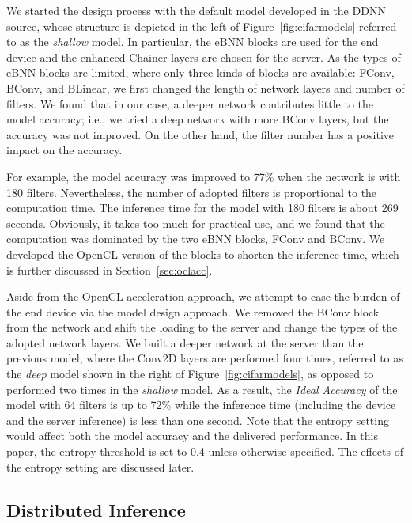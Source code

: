 \documentclass[format=acmsmall, review=false, screen=true]{acmart}
\def\figurename{Figure}
\def\sectionname{Section}
\begin{document}
We started the design process with the default model developed in the DDNN source, whose structure is depicted in the left of \figurename~\ref{fig:cifarmodels} referred to as the \emph{shallow} model. In particular, the eBNN blocks are used for the end device and the enhanced Chainer layers are chosen for the server. As the types of eBNN blocks are limited, where only three kinds of blocks are available: FConv, BConv, and BLinear, we first changed the length of network layers and number of filters. We found that in our case, a deeper network contributes little to the model accuracy; i.e., we tried a deep network with more BConv layers, but the accuracy was not improved. On the other hand, the filter number has a positive impact on the accuracy.

For example, the model accuracy was improved to 77\% when the network is with 180 filters.
Nevertheless, the number of adopted filters is proportional to the computation time. The inference time for the model with 180 filters is about 269 seconds. Obviously, it takes too much for practical use, and we found that the computation was dominated by the two eBNN blocks, FConv and BConv. We developed the OpenCL version of the blocks to shorten the inference time, which is further discussed in \sectionname~\ref{sec:oclacc}.

Aside from the OpenCL acceleration approach, we attempt to ease the burden of the end device via the model design approach. We removed the BConv block from the network and shift the loading to the server and change the types of the adopted network layers. We built a deeper network at the server than the previous model, where the Conv2D layers are performed four times, referred to as the \emph{deep} model shown in the right of \figurename~\ref{fig:cifarmodels}, as opposed to performed two times in the \emph{shallow} model. As a result, the \emph{Ideal Accuracy} of the model with 64 filters is up to 72\% while the inference time (including the device and the server inference) is less than one second. Note that the entropy setting would affect both the model accuracy and the delivered performance. In this paper, the entropy threshold is set to 0.4 unless otherwise specified. The effects of the entropy setting are discussed later.


\subsection{Distributed Inference}
\label{sec:adaptivecomputing}
\end{document}

